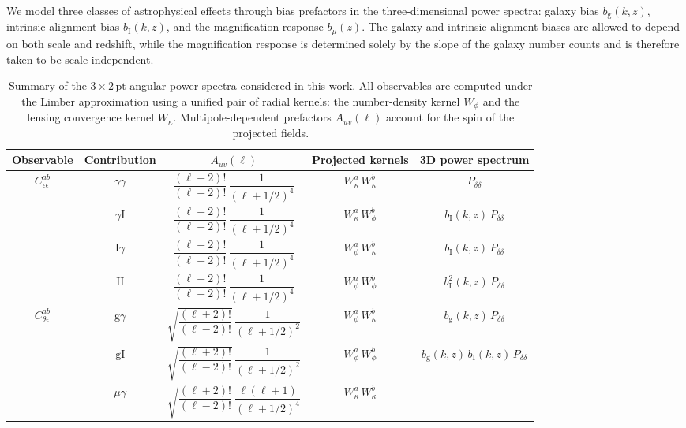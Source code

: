 We model three classes of astrophysical effects through bias prefactors in the three-dimensional power spectra: galaxy bias \(b_\mathrm{g}(k,z)\), intrinsic-alignment bias \(b_\mathrm{I}(k,z)\), and the magnification response \(b_\mu(z)\). The galaxy and intrinsic-alignment biases are allowed to depend on both scale and redshift, while the magnification response is determined solely by the slope of the galaxy number counts and is therefore taken to be scale independent.

\begin{table}[!htbp]
\centering
\caption{Summary of the \(3\times2\,\mathrm{pt}\) angular power spectra considered in this work. All observables are computed under the Limber approximation using a unified pair of radial kernels: the number-density kernel \(W_\phi\) and the lensing convergence kernel \(W_\kappa\). Multipole-dependent prefactors \(A_{uv}(\ell)\) account for the spin of the projected fields.}
\label{tab:1}
\setlength{\tabcolsep}{4pt}
\begin{tabular}{c c c c c}
\hline\hline
Observable
& Contribution
& \(A_{uv}(\ell)\)
& Projected kernels
& 3D power spectrum
\\
\hline
\(C_{\epsilon\epsilon}^{ab}\)
& \(\gamma\gamma\)
& \(\dfrac{(\ell+2)!}{(\ell-2)!}\,\dfrac{1}{(\ell+1/2)^4}\)
& \(W_\kappa^a \, W_\kappa^b\)
& \(P_{\delta\delta}\)
\\
& \(\gamma\mathrm{I}\)
& \(\dfrac{(\ell+2)!}{(\ell-2)!}\,\dfrac{1}{(\ell+1/2)^4}\)
& \(W_\kappa^a \, W_\phi^b\)
& \(b_\mathrm{I}(k,z)\,P_{\delta\delta}\)
\\
& \(\mathrm{I}\gamma\)
& \(\dfrac{(\ell+2)!}{(\ell-2)!}\,\dfrac{1}{(\ell+1/2)^4}\)
& \(W_\phi^a \, W_\kappa^b\)
& \(b_\mathrm{I}(k,z)\,P_{\delta\delta}\)
\\
& \(\mathrm{II}\)
& \(\dfrac{(\ell+2)!}{(\ell-2)!}\,\dfrac{1}{(\ell+1/2)^4}\)
& \(W_\phi^a \, W_\phi^b\)
& \(b_\mathrm{I}^2(k,z)\,P_{\delta\delta}\)
\\
\hline
\(C_{\theta\epsilon}^{ab}\)
& \(\mathrm{g}\gamma\)
& \(\sqrt{\dfrac{(\ell+2)!}{(\ell-2)!}}\,\dfrac{1}{(\ell+1/2)^2}\)
& \(W_\phi^a \, W_\kappa^b\)
& \(b_\mathrm{g}(k,z)\,P_{\delta\delta}\)
\\
& \(\mathrm{g}\mathrm{I}\)
& \(\sqrt{\dfrac{(\ell+2)!}{(\ell-2)!}}\,\dfrac{1}{(\ell+1/2)^2}\)
& \(W_\phi^a \, W_\phi^b\)
& \(b_\mathrm{g}(k,z)\,b_\mathrm{I}(k,z)\,P_{\delta\delta}\)
\\
& \(\mu\gamma\)
& \(\sqrt{\dfrac{(\ell+2)!}{(\ell-2)!}}\,\dfrac{\ell(\ell+1)}{(\ell+1/2)^4}\)
& \(W_\kappa^a \, W_\kappa^b\)

\end{tabular}
\end{table}
